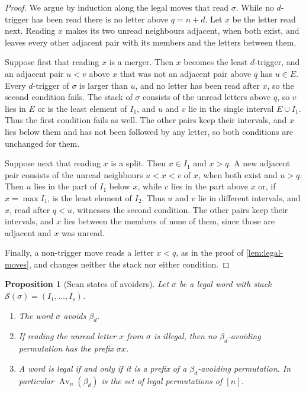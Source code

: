 \documentclass[11pt,reqno]{amsart}
\newtheorem{proposition}[proposition]{Proposition}
\theoremstyle{definition}
\theoremstyle{remark}
\newcommand{\Av}{\operatorname{Av}}
\begin{document}
\begin{proof}
We argue by induction along the legal moves that read $\sigma$.  While no
$d$-trigger has been read there is no letter above $q=n+d$.  Let $x$ be the letter
read next.  Reading $x$ makes its two unread neighbours adjacent, when both
exist, and leaves every other adjacent pair with its members and the letters
between them.

Suppose first that reading $x$ is a merger.  Then $x$ becomes the least
$d$-trigger, and an adjacent pair $u<v$ above $x$ that was not an adjacent
pair above $q$ has $u\in E$.  Every $d$-trigger of $\sigma$ is larger than
$u$, and no letter has been read after $x$, so the second condition fails.
The stack of $\sigma$ consists of the unread letters above $q$, so $v$ lies
in $E$ or is the least element of $I_1$, and $u$ and $v$ lie in the single
interval $E\cup I_1$.  Thus the first condition fails as well.  The
other pairs keep their intervals, and $x$ lies below them and has not been
followed by any letter, so both conditions are unchanged for them.

Suppose next that reading $x$ is a split.  Then $x\in I_1$ and $x>q$.  A new
adjacent pair consists of the unread neighbours $u<x<v$ of $x$, when both
exist and $u>q$.  Then $u$ lies in the part of $I_1$ below $x$, while $v$
lies in the part above $x$ or, if $x=\max I_1$, is the least element of
$I_2$.  Thus $u$ and $v$ lie in different intervals, and $x$, read after
$q<u$, witnesses the second condition.  The other pairs keep their
intervals, and $x$ lies between the members of none of them, since those are
adjacent and $x$ was unread.

Finally, a non-trigger move reads a letter $x<q$, as in the proof of
\cref{lem:legal-moves}, and changes neither the stack nor either condition.
\end{proof}

\begin{proposition}[Scan states of avoiders]\label{prop:scan-states}
Let $\sigma$ be a legal word with stack $\mathcal S(\sigma)=(I_1,\ldots,I_s)$.
\begin{enumerate}
\item[(a)] The word $\sigma$ avoids $\beta_d$.
\item[(b)] If reading the unread letter $x$ from $\sigma$ is illegal, then no
  $\beta_d$-avoiding permutation has the prefix $\sigma x$.
\item[(c)] A word is legal if and only if it is a prefix of a
  $\beta_d$-avoiding permutation.  In particular $\Av_n(\beta_d)$ is the set
  of legal permutations of $[n]$.
\end{enumerate}
\end{proposition}
\end{document}
